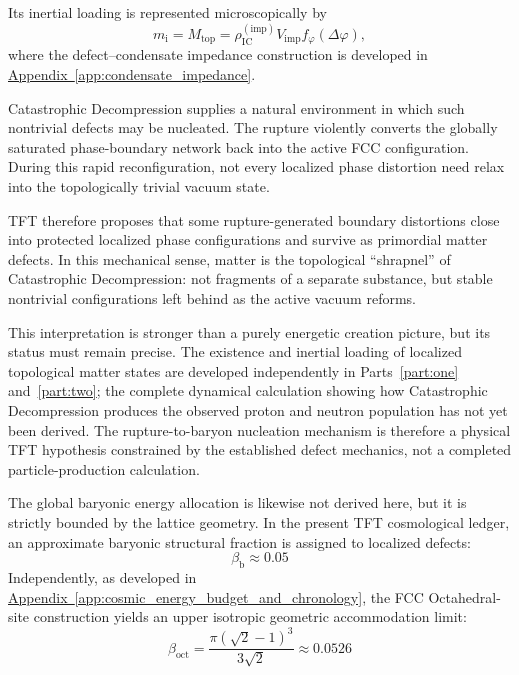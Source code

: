 Its inertial loading is represented microscopically by
\begin{equation}
m_{\mathrm{i}} = M_{\mathrm{top}} = \rho_{\mathrm{IC}}^{(\mathrm{imp})} V_{\mathrm{imp}} f_{\varphi}(\Delta\varphi),
\end{equation}
where the defect--condensate impedance construction is developed in \hyperref[app:condensate_impedance]{Appendix~\ref*{app:condensate_impedance}}.

Catastrophic Decompression supplies a natural environment in which such nontrivial defects may be nucleated. The rupture violently converts the globally saturated phase-boundary network back into the active FCC configuration. During this rapid reconfiguration, not every localized phase distortion need relax into the topologically trivial vacuum state.

TFT therefore proposes that some rupture-generated boundary distortions close into protected localized phase configurations and survive as primordial matter defects. In this mechanical sense, matter is the topological ``shrapnel'' of Catastrophic Decompression: not fragments of a separate substance, but stable nontrivial configurations left behind as the active vacuum reforms.

This interpretation is stronger than a purely energetic creation picture, but its status must remain precise. The existence and inertial loading of localized topological matter states are developed independently in Parts~\ref{part:one} and~\ref{part:two}; the complete dynamical calculation showing how Catastrophic Decompression produces the observed proton and neutron population has not yet been derived. The rupture-to-baryon nucleation mechanism is therefore a physical TFT hypothesis constrained by the established defect mechanics, not a completed particle-production calculation.

The global baryonic energy allocation is likewise not derived here, but it is strictly bounded by the lattice geometry. In the present TFT cosmological ledger, an approximate baryonic structural fraction is assigned to localized defects:
\begin{equation}
    \beta_{\mathrm b}
    \approx
    0.05
\end{equation}
Independently, as developed in \hyperref[app:cosmic_energy_budget_and_chronology]{Appendix~\ref*{app:cosmic_energy_budget_and_chronology}}, the FCC Octahedral-site construction yields an upper isotropic geometric accommodation limit:
\begin{equation}
    \beta_{\mathrm{oct}}
    =
    \frac{\pi(\sqrt{2}-1)^3}{3\sqrt{2}}
    \approx
    0.0526
\end{equation}

